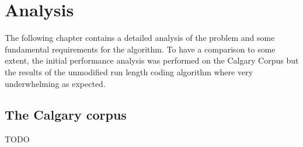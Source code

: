 
\chapter{Analysis}
\label{ch:Analysis}

\par{
The following chapter contains a detailed analysis of the problem and some fundamental requirements for the algorithm. To have a comparison to some extent, the initial performance analysis was performed on the Calgary Corpus but the results of the unmodified run length coding algorithm where very underwhelming as expected.
}

\section{The Calgary corpus}
\par{
TODO
}

